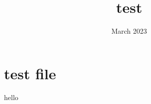 \documentclass{article}
\title{test}
\date{March 2023}
\begin{document}
\maketitle

\section{test file}
   hello
\end{document}
